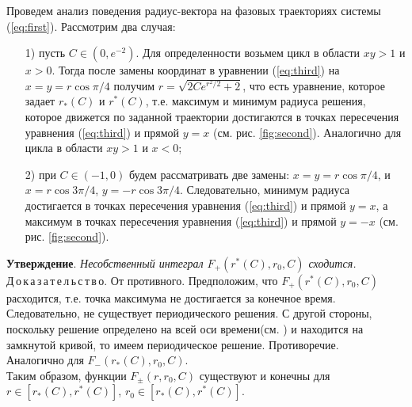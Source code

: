 \documentclass{article}
\begin{document}
Проведем анализ поведения радиус-вектора на фазовых траекториях системы (\ref{eq:first}). Рассмотрим два случая:
\begin{enumerate}
    \item [{1)}] пусть $C\in(0, e^{-2})$. Для определенности возьмем цикл в области $xy > 1$ и $x > 0$. Тогда после замены координат в уравнении (\ref{eq:third}) на $x = y = r\cos{\pi/4}$ получим $r = \sqrt{2C e^{r^2/2} + 2}$, что есть уравнение, которое задает $r_*(C)$ и $r^*(C)$, т.е. максимум и минимум радиуса решения, которое движется по заданной траектории достигаются в точках пересечения уравнения (\ref{eq:third}) и прямой $y = x$ (см. рис. \ref{fig:second}). Аналогично для цикла в области $xy > 1$ и $x < 0$;
    \item [{2)}] при $C\in(-1, 0)$ будем рассматривать две замены: $x = y = r\cos{\pi/4}$, и $x = r\cos{3\pi/4}$, $y = -r\cos{3\pi/4}$. Следовательно, минимум радиуса достигается в точках пересечения уравнения (\ref{eq:third}) и прямой $y = x$, а максимум в точках пересечения уравнения (\ref{eq:third}) и прямой $y = -x$ (см. рис. \ref{fig:second}). 
\end{enumerate}

\textbf{Утверждение}.\textit{ Несобственный интеграл $F_+(r^*(C), r_0,C)$ сходится.}\\ 
Д\,о\,к\,а\,з\,а\,т\,е\,л\,ь\,с\,т\,в\,о. От противного. Предположим, что $F_+(r^*(C), r_0, C)$ расходится, т.е. точка максимума не достигается за конечное время. Следовательно, не существует периодического решения. С другой стороны, поскольку решение определено на всей оси времени(см. \cite{basov}) и находится на замкнутой кривой, то имеем периодическое решение. Противоречие.\\
Аналогично для $F_-(r_*(C), r_0, C)$.\\

Таким образом, функции $F_\pm(r,r_0, C)$ существуют и конечны для $r \in [r_*(C), r^*(C)]$, $r_0 \in [r_*(C), r^*(C)]$.
\end{document}
